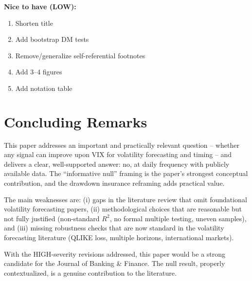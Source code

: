 \documentclass[12pt,a4paper]{article}
\begin{document}
\noindent\textbf{Nice to have (LOW):}
\begin{enumerate}[resume]
    \item Shorten title
    \item Add bootstrap DM tests
    \item Remove/generalize self-referential footnotes
    \item Add 3--4 figures
    \item Add notation table
\end{enumerate}


\section{Concluding Remarks}
\label{sec:remarks}

This paper addresses an important and practically relevant question -- whether any signal can improve upon VIX for volatility forecasting and timing -- and delivers a clear, well-supported answer: no, at daily frequency with publicly available data. The ``informative null'' framing is the paper's strongest conceptual contribution, and the drawdown insurance reframing adds practical value.

The main weaknesses are: (i) gaps in the literature review that omit foundational volatility forecasting papers, (ii) methodological choices that are reasonable but not fully justified (non-standard $R^2$, no formal multiple testing, uneven samples), and (iii) missing robustness checks that are now standard in the volatility forecasting literature (QLIKE loss, multiple horizons, international markets).

With the HIGH-severity revisions addressed, this paper would be a strong candidate for the Journal of Banking \& Finance. The null result, properly contextualized, is a genuine contribution to the literature.
\end{document}
